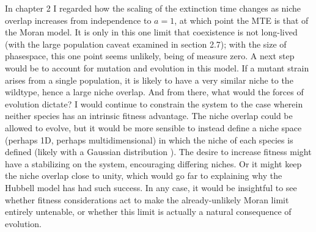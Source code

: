 In chapter 2 I regarded how the scaling of the extinction time changes as niche overlap increases from independence to $a=1$, at which point the MTE is that of the Moran model. 
It is only in this one limit that coexistence is not long-lived (with the large population caveat examined in section 2.7); with the size of phasespace, this one point seems unlikely, being of measure zero. 
A next step would be to account for mutation and evolution in this model. 
If a mutant strain arises from a single population, it is likely to have a very similar niche to the wildtype, hence a large niche overlap. 
And from there, what would the forces of evolution dictate? I would continue to constrain the system to the case wherein neither species has an intrinsic fitness advantage. 
The niche overlap could be allowed to evolve, but it would be more sensible to instead define a niche space (perhaps 1D, perhaps multidimensional) in which the niche of each species is defined (likely with a Gaussian distribution \cite{MacArthur}). 
The desire to increase fitness might have a stabilizing on the system, encouraging differing niches. Or it might keep the niche overlap close to unity, which would go far to explaining why the Hubbell model has had such success. 
In any case, it would be insightful to see whether fitness considerations act to make the already-unlikely Moran limit entirely untenable, or whether this limit is actually a natural consequence of evolution. 

